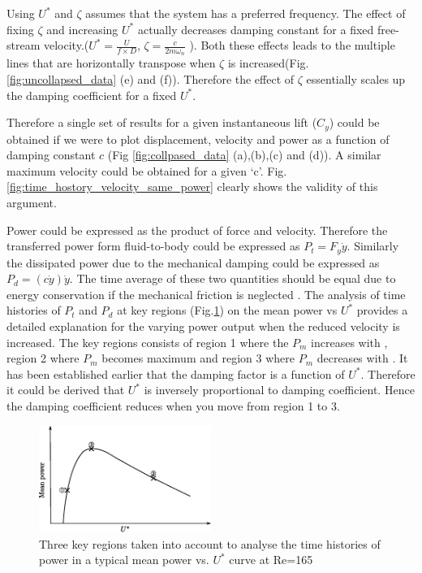  Using $U^*$ and $\zeta$ assumes that the system has a preferred frequency. The effect of fixing $\zeta$ and increasing $U^*$ actually decreases damping constant for a fixed free-stream velocity.($U^*=\frac{U}{f \times D}$, $\zeta= \frac{c}{2 m \omega_n}$ ). Both these effects leads to the multiple lines that are horizontally transpose when $\zeta$ is increased(Fig.\ref{fig:uncollapsed_data} (e) and (f)). Therefore the effect of $\zeta$ essentially scales up the damping coefficient for a fixed $U^*$. 
 \vspace{1cm}
 
 Therefore a single set of results for a given instantaneous lift ($C_y$) could be obtained if we were to plot displacement, velocity and power as a function of damping constant $c$ (Fig \ref{fig:collpased_data} (a),(b),(c) and (d)). A similar maximum velocity could be obtained for a given `c'. Fig.\ref{fig:time_hostory_velocity_same_power} clearly shows the validity of this argument. 
 


 



 
 Power could be expressed as the product of force and velocity. Therefore the transferred power form fluid-to-body could be expressed as $P_t=F_y\dot{y}$. Similarly the dissipated power due to the mechanical damping could be expressed as $P_d=(c\dot{y})\dot{y}$. The time average of these two quantities should be equal due to energy conservation if the mechanical friction is neglected . The analysis of time histories of $P_t $ and $P_d$ at key regions (Fig.\ref{fig:regions_1}) on the mean power vs $U^*$ provides a detailed explanation for the varying power output when the reduced velocity is increased. The key regions consists of region 1 where the $P_m$ increases with \ustar, region 2 where $P_m$ becomes maximum and region 3 where $P_m$ decreases with \ustar. It has been established earlier that the damping factor is a function of $U^*$. Therefore it could be derived that $U^*$ is inversely proportional to damping coefficient. Hence the damping coefficient reduces when you move from region 1 to 3.  

\begin{figure}[h!]
\centering
\includegraphics[width=0.5\textwidth]{../FnP/sketch_1}
\caption{ Three key regions taken into account to analyse the time histories of power in a typical mean power vs. $U^*$ curve at Re=165 }
\label{fig:regions_1}
\end{figure}



